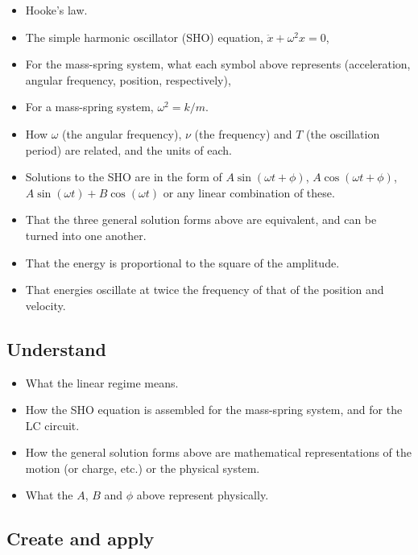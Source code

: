 \documentclass[11pt]{article}
\providecommand{\tightlist}{%
      \setlength{\itemsep}{0pt}\setlength{\parskip}{0pt}}
\begin{document}
\begin{itemize}
\tightlist
\item
  Hooke's law.
\item
  The simple harmonic oscillator (SHO) equation,
  \(\ddot x + \omega^2 x = 0\),
\item
  For the mass-spring system, what each symbol above represents
  (acceleration, angular frequency, position, respectively),
\item
  For a mass-spring system, \(\omega^2 = k/m\).
\item
  How \(\omega\) (the angular frequency), \(\nu\) (the frequency) and
  \(T\) (the oscillation period) are related, and the units of each.
\item
  Solutions to the SHO are in the form of \(A\sin(\omega t + \phi)\),
  \(A\cos(\omega t + \phi)\), \(A\sin(\omega t) + B\cos(\omega t)\) or
  any linear combination of these.
\item
  That the three general solution forms above are equivalent, and can be
  turned into one another.
\item
  That the energy is proportional to the square of the amplitude.
\item
  That energies oscillate at twice the frequency of that of the position
  and velocity.
\end{itemize}

    \hypertarget{understand}{%
\subsection{Understand}\label{understand}}

\begin{itemize}
\tightlist
\item
  What the linear regime means.
\item
  How the SHO equation is assembled for the mass-spring system, and for
  the LC circuit.
\item
  How the general solution forms above are mathematical representations
  of the motion (or charge, etc.) or the physical system.
\item
  What the \(A\), \(B\) and \(\phi\) above represent physically.
\end{itemize}

    \hypertarget{create-and-apply}{%
\subsection{Create and apply}\label{create-and-apply}}
\end{document}
